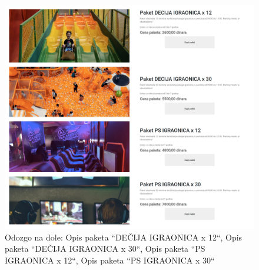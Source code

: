\documentclass[../main.tex]{subfiles}
\begin{document}
\begin{figure}[!ht]
\begin{center}
\includegraphics[scale=0.20]{sections/korisnicki_interfejs/screenshots/paketiIgraonica.jpg}
\end{center}
\caption{Odozgo na dole: Opis paketa ``DEČIJA IGRAONICA x 12``, Opis paketa ``DEČIJA IGRAONICA x 30``, Opis paketa ``PS IGRAONICA x 12``, Opis paketa ``PS IGRAONICA x 30``}
\label{fig:decijax12}
\end{figure}
\end{document}
